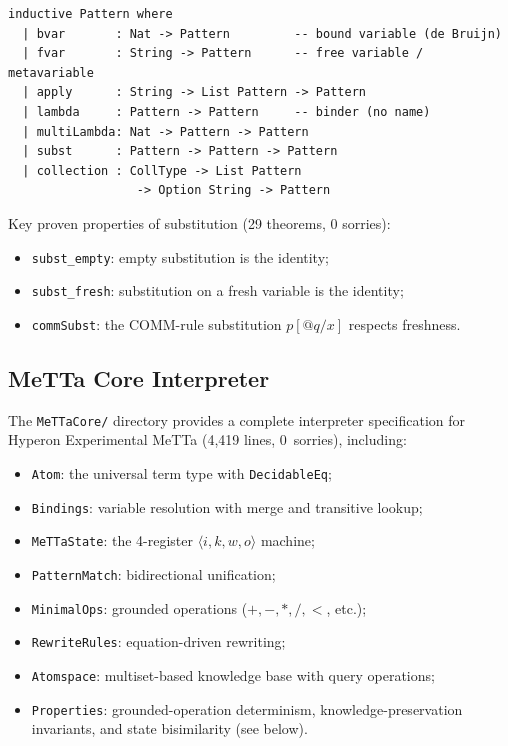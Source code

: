 \documentclass[]{article}
\newcommand{\code}[1]{\texttt{#1}}
\begin{document}
\begin{lstlisting}[caption={Pattern AST --- locally nameless (Syntax.lean)}]
inductive Pattern where
  | bvar       : Nat -> Pattern         -- bound variable (de Bruijn)
  | fvar       : String -> Pattern      -- free variable / metavariable
  | apply      : String -> List Pattern -> Pattern
  | lambda     : Pattern -> Pattern     -- binder (no name)
  | multiLambda: Nat -> Pattern -> Pattern
  | subst      : Pattern -> Pattern -> Pattern
  | collection : CollType -> List Pattern
                  -> Option String -> Pattern
\end{lstlisting}

Key proven properties of substitution (29 theorems, 0 sorries):
\begin{itemize}
\item \code{subst\_empty}: empty substitution is the identity;
\item \code{subst\_fresh}: substitution on a fresh variable is the identity;
\item \code{commSubst}: the COMM-rule substitution $p[@q/x]$ respects freshness.
\end{itemize}

\subsection{MeTTa Core Interpreter}
\label{sec:mettacore}

The \code{MeTTaCore/} directory provides a complete interpreter specification for
Hyperon Experimental MeTTa (4{,}419 lines, 0~sorries), including:
\begin{itemize}
\item \code{Atom}: the universal term type with \code{DecidableEq};
\item \code{Bindings}: variable resolution with merge and transitive lookup;
\item \code{MeTTaState}: the 4-register $\langle i, k, w, o \rangle$ machine;
\item \code{PatternMatch}: bidirectional unification;
\item \code{MinimalOps}: grounded operations ($+, -, *, /, <$, etc.);
\item \code{RewriteRules}: equation-driven rewriting;
\item \code{Atomspace}: multiset-based knowledge base with query operations;
\item \code{Properties}: grounded-operation determinism, knowledge-preservation
  invariants, and state bisimilarity (see below).
\end{itemize}
\end{document}
